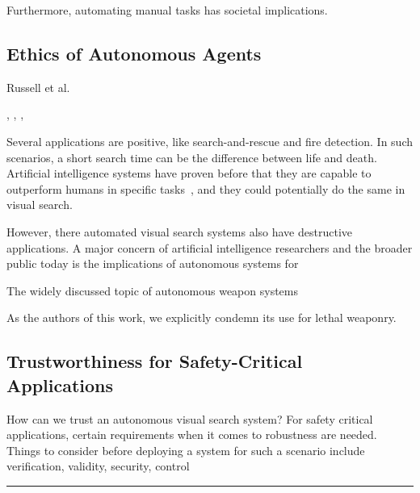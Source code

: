 Furthermore, automating manual tasks has societal implications.


\subsection{Ethics of Autonomous Agents}

Russell et al.~\cite{russell_priorities_2015}

\cite{vinuesa_sustainable_2020}, \cite{russell_ethics_2015}, \cite{russell_beneficial_2022}, \cite{brundage_malicious_2018}

Several applications are positive, like search-and-rescue and fire detection.
In such scenarios, a short search time can be the difference between life and death.
Artificial intelligence systems have proven before that they are capable to outperform humans in specific tasks~\cite{silver_alphago_2016,vinyals_alphastar_2019}, and they could potentially do the same in visual search.

However, there automated visual search systems also have destructive applications.
A major concern of artificial intelligence researchers and the broader public today is the implications of autonomous systems for 

The widely discussed topic of autonomous weapon systems


As the authors of this work, we explicitly condemn its use for lethal weaponry.

\subsection{Trustworthiness for Safety-Critical Applications}

How can we trust an autonomous visual search system?
For safety critical applications, certain requirements when it comes to robustness are needed.
Things to consider before deploying a system for such a scenario include verification, validity, security, control




\rule{5cm}{1pt}

